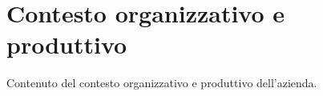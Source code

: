 \section{Contesto organizzativo e produttivo}

Contenuto del contesto organizzativo e produttivo dell'azienda.
